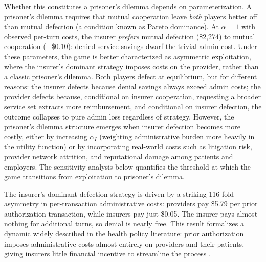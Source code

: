 Whether this constitutes a prisoner's dilemma depends on parameterization. A prisoner's dilemma requires that mutual cooperation leave \emph{both} players better off than mutual defection (a condition known as Pareto dominance). At $\alpha = 1$ with observed per-turn costs, the insurer \emph{prefers} mutual defection (\$2,274) to mutual cooperation ($-$\$0.10): denied-service savings dwarf the trivial admin cost. Under these parameters, the game is better characterized as asymmetric exploitation, where the insurer's dominant strategy imposes costs on the provider, rather than a classic prisoner's dilemma. Both players defect at equilibrium, but for different reasons: the insurer defects because denial savings always exceed admin costs; the provider defects because, conditional on insurer cooperation, requesting a broader service set extracts more reimbursement, and conditional on insurer defection, the outcome collapses to pure admin loss regardless of strategy. However, the prisoner's dilemma structure emerges when insurer defection becomes more costly, either by increasing $\alpha_I$ (weighting administrative burden more heavily in the utility function) or by incorporating real-world costs such as litigation risk, provider network attrition, and reputational damage among patients and employers. The sensitivity analysis below quantifies the threshold at which the game transitions from exploitation to prisoner's dilemma.

The insurer's dominant defection strategy is driven by a striking 116-fold asymmetry in per-transaction administrative costs: providers pay \$5.79 per prior authorization transaction, while insurers pay just \$0.05. The insurer pays almost nothing for additional turns, so denial is nearly free. This result formalizes a dynamic widely described in the health policy literature: prior authorization imposes administrative costs almost entirely on providers and their patients, giving insurers little financial incentive to streamline the process \citep{ama2024pa}.

